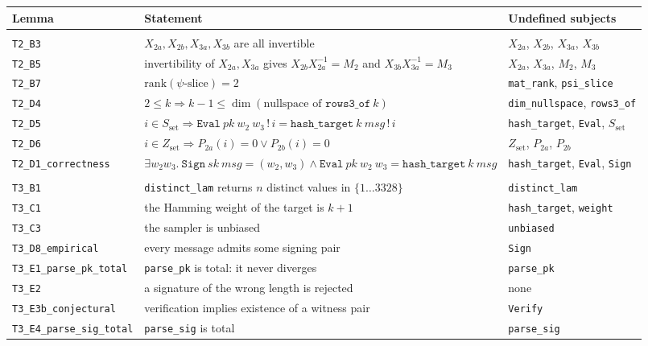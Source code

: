\begin{center}
\small
\setlength{\tabcolsep}{4pt}
\begin{tabular}{@{}>{\raggedright\arraybackslash}p{4.05cm}>{\raggedright\arraybackslash}p{6.5cm}>{\raggedright\arraybackslash}p{4.3cm}@{}}
\toprule
Lemma & Statement & Undefined subjects \\
\midrule
\multicolumn{3}{@{}l}{\textit{T2}} \\
\texttt{T2\_B3} & $X_{2a}, X_{2b}, X_{3a}, X_{3b}$ are all invertible & $X_{2a}$, $X_{2b}$, $X_{3a}$, $X_{3b}$ \\
\texttt{T2\_B5} & invertibility of $X_{2a}, X_{3a}$ gives $X_{2b}X_{2a}^{-1} = M_2$ and $X_{3b}X_{3a}^{-1} = M_3$ & $X_{2a}$, $X_{3a}$, $M_2$, $M_3$ \\
\texttt{T2\_B7} & $\mathrm{rank}(\psi\text{-slice}) = 2$ & \texttt{mat\_rank}, \texttt{psi\_slice} \\
\texttt{T2\_D4} & $2 \le k \Rightarrow k - 1 \le \dim(\text{nullspace of } \texttt{rows3\_of}\ k)$ & \texttt{dim\_nullspace}, \texttt{rows3\_of} \\
\texttt{T2\_D5} & $i \in S_{\mathrm{set}} \Rightarrow \texttt{Eval}\ pk\ w_2\ w_3\, !\, i = \texttt{hash\_target}\ k\ msg\, !\, i$ & \texttt{hash\_target}, \texttt{Eval}, $S_{\mathrm{set}}$ \\
\texttt{T2\_D6} & $i \in Z_{\mathrm{set}} \Rightarrow P_{2a}(i) = 0 \lor P_{2b}(i) = 0$ & $Z_{\mathrm{set}}$, $P_{2a}$, $P_{2b}$ \\
\texttt{T2\_D1\_correctness} & $\exists w_2 w_3.\ \texttt{Sign}\ sk\ msg = (w_2, w_3) \land \texttt{Eval}\ pk\ w_2\ w_3 = \texttt{hash\_target}\ k\ msg$ & \texttt{hash\_target}, \texttt{Eval}, \texttt{Sign} \\
\midrule
\multicolumn{3}{@{}l}{\textit{T3}} \\
\texttt{T3\_B1} & \texttt{distinct\_lam} returns $n$ distinct values in $\{1 \ldots 3328\}$ & \texttt{distinct\_lam} \\
\texttt{T3\_C1} & the Hamming weight of the target is $k + 1$ & \texttt{hash\_target}, \texttt{weight} \\
\texttt{T3\_C3} & the sampler is unbiased & \texttt{unbiased} \\
\texttt{T3\_D8\_empirical} & every message admits some signing pair & \texttt{Sign} \\
\texttt{T3\_E1\_parse\_pk\_total} & \texttt{parse\_pk} is total: it never diverges & \texttt{parse\_pk} \\
\texttt{T3\_E2} & a signature of the wrong length is rejected & none \\
\texttt{T3\_E3b\_conjectural} & verification implies existence of a witness pair & \texttt{Verify} \\
\texttt{T3\_E4\_parse\_sig\_total} & \texttt{parse\_sig} is total & \texttt{parse\_sig} \\
\bottomrule
\end{tabular}
\end{center}

